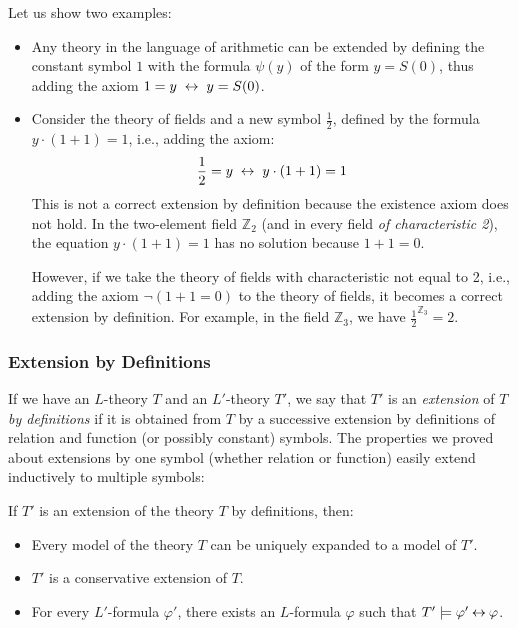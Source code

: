 \begin{example}
    Let us show two examples:
    \begin{itemize}
        \item Any theory in the language of arithmetic can be extended by defining the constant symbol $1$ with the formula $\psi(y)$ of the form $y=S(0)$, thus adding the axiom $1=y\ \liff\ y=S(0)$.
        \item Consider the theory of fields and a new symbol $\frac{1}{2}$, defined by the formula $y\cdot (1+1)=1$, i.e., adding the axiom:
        $$
        \frac{1}{2}=y\ \liff\ y\cdot (1+1)=1
        $$
        This is not a correct extension by definition because the existence axiom does not hold. In the two-element field $\mathbb Z_2$ (and in every field \emph{of characteristic 2}), the equation $y\cdot (1+1)=1$ has no solution because $1+1=0$.
        
        
        However, if we take the theory of fields with characteristic not equal to 2, i.e., adding the axiom $\neg (1+1=0)$ to the theory of fields, it becomes a correct extension by definition. For example, in the field $\mathbb Z_3$, we have $\frac{1}{2}^{\mathbb Z_3}=2$.
    \end{itemize}
\end{example}


\subsubsection*{Extension by Definitions}

If we have an $L$-theory $T$ and an $L'$-theory $T'$, we say that $T'$ is an \emph{extension} of $T$ \emph{by definitions} if it is obtained from $T$ by a successive extension by definitions of relation and function (or possibly constant) symbols. The properties we proved about extensions by one symbol (whether relation or function) easily extend inductively to multiple symbols:

\begin{corollary}
   If $T'$ is an extension of the theory $T$ by definitions, then:
   \begin{itemize}
    \item Every model of the theory $T$ can be uniquely expanded to a model of $T'$.
    \item $T'$ is a conservative extension of $T$.
    \item For every $L'$-formula $\varphi'$, there exists an $L$-formula $\varphi$ such that $T'\models\varphi'\mathbin{\leftrightarrow}\varphi$.
   \end{itemize}
\end{corollary}


